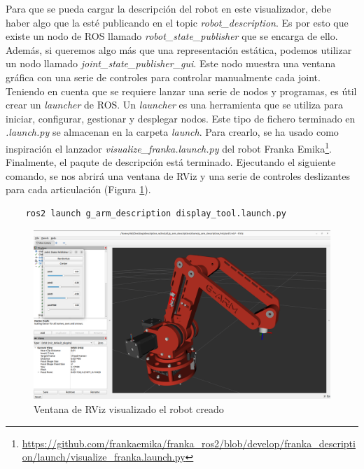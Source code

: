 Para que se pueda cargar la descripción del robot en este visualizador, debe haber algo que la esté publicando en el topic 
\textit{robot\_description}. Es por esto que existe un nodo de ROS llamado \textit{robot\_state\_publisher} que se encarga 
de ello. Además, si queremos algo más que una representación estática, podemos utilizar un nodo llamado \mbox{\textit{joint\_state\_publisher\_gui}}. Este nodo 
muestra una ventana gráfica con una serie de controles para controlar manualmente cada joint. 
\\

Teniendo en cuenta que se requiere lanzar una serie de nodos y programas, es útil crear un \textit{launcher} de ROS. Un \textit{launcher} es una 
herramienta que se utiliza para iniciar, configurar, gestionar y desplegar nodos. Este tipo de fichero terminado en 
\textit{.launch.py} se almacenan en la carpeta \textit{launch}. Para crearlo, se ha usado como inspiración el lanzador \textit{visualize\_franka.launch.py} del 
robot Franka Emika\footnote{\url{https://github.com/frankaemika/franka_ros2/blob/develop/franka_description/launch/visualize_franka.launch.py}}.
\\

Finalmente, el paqute de descripción está terminado. Ejecutando el siguiente comando, se nos abrirá una ventana de RViz y una 
serie de controles deslizantes para cada articulación (Figura \ref{fig:rviz}).
\begin{verbatim}
    ros2 launch g_arm_description display_tool.launch.py
\end{verbatim}

\begin{figure} [ht!]
    \begin{center}
        \includegraphics[width=15cm]{figs/RViz.png}
    \end{center}
    \caption{Ventana de RViz visualizado el robot creado}
\label{fig:rviz}
\end{figure}

